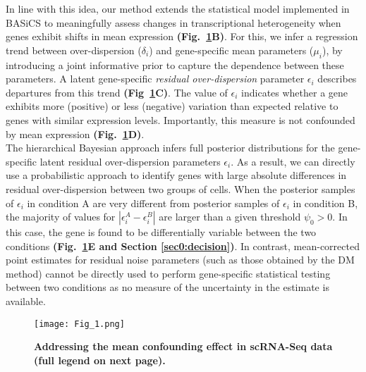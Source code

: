 In line with this idea, our method extends the statistical model implemented in BASiCS \citep{Vallejos2015BASiCS, Vallejos2016} to meaningfully assess changes in transcriptional heterogeneity when genes exhibit shifts in mean expression \textbf{(Fig.~\ref{fig2:Schematic_model}B)}. For this, we infer a regression trend between over-dispersion ($\delta_i$) and gene-specific mean parameters ($\mu_i$), by introducing a joint informative prior to capture the dependence between these parameters. A latent gene-specific \textit{residual over-dispersion} parameter $\epsilon_i$ describes departures from this trend \textbf{(Fig~\ref{fig2:Schematic_model}C)}. The value of $\epsilon_i$ indicates whether a gene exhibits more (positive) or less (negative) variation than expected relative to genes with similar expression levels. Importantly, this measure is not confounded by mean expression \textbf{(Fig.~\ref{fig2:Schematic_model}D)}. \\

The hierarchical Bayesian approach infers full posterior distributions for the gene-specific latent residual over-dispersion parameters $\epsilon_i$. As a result, we can directly use a probabilistic approach to identify genes with large absolute differences in residual over-dispersion between two groups of cells. When the posterior samples of $\epsilon_i$ in condition A are very different from posterior samples of $\epsilon_i$ in condition B, the majority of values for $|\epsilon_i^A - \epsilon_i^B|$ are larger than a given threshold $\psi_0>0$. In this case, the gene is found to be differentially variable between the two conditions  \textbf{(Fig.~\ref{fig2:Schematic_model}E and Section \ref{sec0:decision})}. In contrast, mean-corrected point estimates for residual noise parameters (such as those obtained by the DM method) cannot be directly used to perform gene-specific statistical testing between two conditions as no measure of the uncertainty in the estimate is available.\\

\newpage

\begin{figure}[!h]
\centering
\texttt{[image: Fig\_1.png]}
\caption[Addressing the mean confounding effect in scRNA-Seq data]{\textbf{Addressing the mean confounding effect in scRNA-Seq data (full legend on next page).}\\}
\label{fig2:Schematic_model}
\end{figure}

\newpage

